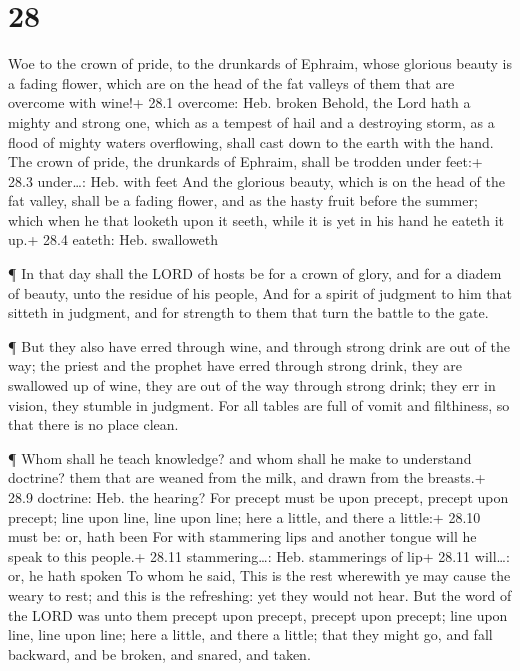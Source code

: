 \hypertarget{section-27}{%
\section{28}\label{section-27}}

 Woe to the crown of pride, to the drunkards of Ephraim,
whose glorious beauty is a fading flower, which are on the head of the
fat valleys of them that are overcome with wine!+ 28.1 overcome: Heb.
broken  Behold, the Lord hath a mighty and strong one, which
as a tempest of hail and a destroying storm, as a flood of mighty waters
overflowing, shall cast down to the earth with the hand. 
The crown of pride, the drunkards of Ephraim, shall be trodden under
feet:+ 28.3 under\ldots: Heb. with feet  And the glorious
beauty, which is on the head of the fat valley, shall be a fading
flower, and as the hasty fruit before the summer; which when he that
looketh upon it seeth, while it is yet in his hand he eateth it up.+
28.4 eateth: Heb. swalloweth

 ¶ In that day shall the LORD of hosts be for a crown of
glory, and for a diadem of beauty, unto the residue of his people,
 And for a spirit of judgment to him that sitteth in
judgment, and for strength to them that turn the battle to the gate.

 ¶ But they also have erred through wine, and through strong
drink are out of the way; the priest and the prophet have erred through
strong drink, they are swallowed up of wine, they are out of the way
through strong drink; they err in vision, they stumble in judgment.
 For all tables are full of vomit and filthiness, so that
there is no place clean.

 ¶ Whom shall he teach knowledge? and whom shall he make to
understand doctrine? them that are weaned from the milk, and drawn from
the breasts.+ 28.9 doctrine: Heb. the hearing?  For precept
must be upon precept, precept upon precept; line upon line, line upon
line; here a little, and there a little:+ 28.10 must be: or, hath been
 For with stammering lips and another tongue will he speak
to this people.+ 28.11 stammering\ldots: Heb. stammerings of lip+ 28.11
will\ldots: or, he hath spoken  To whom he said, This is
the rest wherewith ye may cause the weary to rest; and this is the
refreshing: yet they would not hear.  But the word of the
LORD was unto them precept upon precept, precept upon precept; line upon
line, line upon line; here a little, and there a little; that they might
go, and fall backward, and be broken, and snared, and taken.

